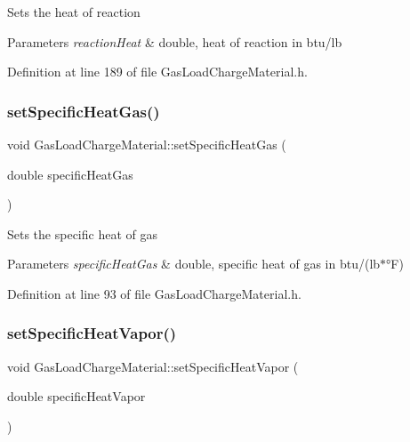 Sets the heat of reaction 
\begin{DoxyParams}{Parameters}
{\em reaction\+Heat} & double, heat of reaction in btu/lb \\
\hline
\end{DoxyParams}


Definition at line 189 of file Gas\+Load\+Charge\+Material.\+h.

\mbox{\label{class_gas_load_charge_material_a07bf6d4ee9161683fbeb3baad16ea7be}} 
\subsubsection{\texorpdfstring{set\+Specific\+Heat\+Gas()}{setSpecificHeatGas()}}
{\footnotesize\ttfamily void Gas\+Load\+Charge\+Material\+::set\+Specific\+Heat\+Gas (\begin{DoxyParamCaption}\item[{double}]{specific\+Heat\+Gas }\end{DoxyParamCaption})\hspace{0.3cm}{\ttfamily [inline]}}

Sets the specific heat of gas 
\begin{DoxyParams}{Parameters}
{\em specific\+Heat\+Gas} & double, specific heat of gas in btu/(lb$\ast$°F) \\
\hline
\end{DoxyParams}


Definition at line 93 of file Gas\+Load\+Charge\+Material.\+h.

\mbox{\label{class_gas_load_charge_material_a7498eba84bb8bdfc5344f0e44418260b}} 
\subsubsection{\texorpdfstring{set\+Specific\+Heat\+Vapor()}{setSpecificHeatVapor()}}
{\footnotesize\ttfamily void Gas\+Load\+Charge\+Material\+::set\+Specific\+Heat\+Vapor (\begin{DoxyParamCaption}\item[{double}]{specific\+Heat\+Vapor }\end{DoxyParamCaption})\hspace{0.3cm}{\ttfamily [inline]}}

